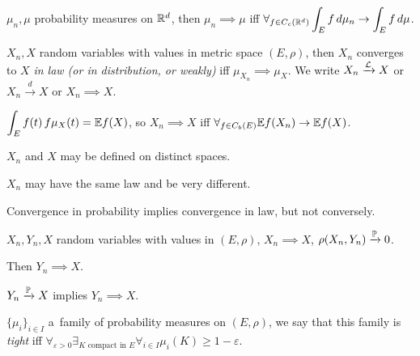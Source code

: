 	\begin{proposition}
		$\mu_n, \mu$ probability measures on $\R^d$, then $\mu_n \implies \mu$ iff $ \displaystyle \forall_{f \in C_c(\R^d)} \int_E f\,d\mu_n \to \int_E f\,d\mu$.
	\end{proposition}
	
	\begin{definition}
		$X_n, X$ random variables with values in metric space $(E, \rho)$, then $X_n$ converges to $X$ \emph{in law (or in distribution, or weakly)} iff $\mu_{X_n} \implies \mu_X$. We write $X_n \xrightarrow{\mc{L}} X$ or $X_n \xrightarrow{d} X$ or $X_n \implies X$.
	\end{definition}
	
	\begin{remark}
		$\displaystyle \int_E f(t)\,f\mu_X(t) = \E f(X)$, so $X_n \implies X$ iff $\displaystyle \forall_{f \in C_b(E)} \E f(X_n) \to \E f(X)$.
	\end{remark}
	
	\begin{remark}
		$X_n$ and $X$ may be defined on distinct spaces.
	\end{remark}
	
	\begin{remark}
		$X_n$ may have the same law and be very different.
	\end{remark}
	
	\begin{remark}
		Convergence in probability implies convergence in law, but not conversely.
	\end{remark}
	
	\begin{proposition}
		$X_n, Y_n, X$ random variables with values in $(E, \rho)$, $X_n \implies X$, $\rho(X_n, Y_n) \xrightarrow{\P} 0$.
		
		Then $Y_n \implies X$.
	\end{proposition}
	
	\begin{corollary}
		$Y_n \xrightarrow{\P} X$ implies $Y_n \implies X$.
	\end{corollary}
	
	\begin{definition}
		$\{\mu_i\}_{i \in I}$ a~family of probability measures on $(E, \rho)$, we say that this family is \emph{tight} iff $\displaystyle \forall_{\varepsilon>0} \exists_{K\text{ compact in }E} \forall_{i \in I} \mu_i(K) \geq 1 - \varepsilon$.
	\end{definition}
	
